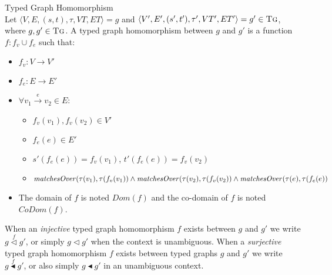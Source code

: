 \begin{definition}{Typed Graph Homomorphism\\}
\label{def:typed_graph_homomorphism}
Let $\langle V,E,(s,t),\tau,VT,ET\rangle=g$ and $\langle V',E',(s',t'),\tau',VT',ET'\rangle=g'\in \textsc{Tg}$, where $g, g' \in \textsc{Tg}$. A typed graph homomorphism between $g$ and $g'$ is a function $f: f_v \cup f_e$ such that:
\begin{itemize}
\item $f_v: V\rightarrow V'$
\item $f_e: E\rightarrow E'$
\item $\forall v_1 \xrightarrow{e} v_2\in E$:
\begin{itemize}
\item $f_v(v_1), f_v(v_2) \in V'$
\item $f_e(e) \in E'$
\item $s'(f_e(e)) = f_v(v_1)$, $t'(f_e(e)) = f_v(v_2)$
\item $\mathit{matchesOver}(\tau(v_1), \tau(f_v(v_1)) \land \\\mathit{matchesOver}(\tau(v_2), \tau(f_v(v_2)) \land\\ \mathit{matchesOver}(\tau(e), \tau(f_e(e))$
\end{itemize}

\item The domain of $f$ is noted $Dom(f)$ and the co-domain of $f$ is noted $CoDom(f)$.
\end{itemize}  
\end{definition}

 When an \emph{injective} typed graph homomorphism $f$ exists between $g$ and $g'$ we write $g \stackrel{f}{\vartriangleleft} g'$, or simply $g \vartriangleleft g'$ when the context is unambiguous. When a \emph{surjective} typed graph homomorphism $f$ exists between typed graphs $g$ and $g'$ we write $g \stackrel{f}{\blacktriangleleft} g'$, or also simply $g \blacktriangleleft g'$ in an unambiguous context. 




